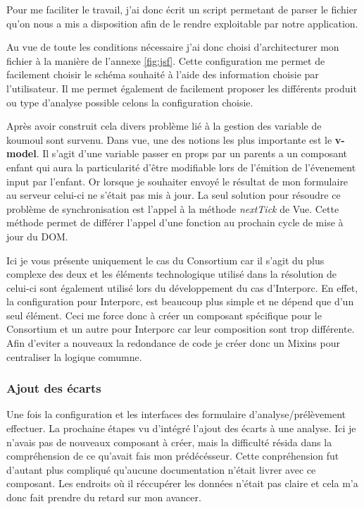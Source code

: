 Pour me faciliter le travail, j'ai donc écrit un script permetant de parser le fichier qu'on nous a mis a disposition afin de le rendre exploitable par notre application. 

Au vue de toute les conditions nécessaire j'ai donc choisi d'architecturer mon fichier à la manière de l'annexe \ref{fig:jsf}. Cette configuration me permet de facilement choisir le schéma souhaité à l'aide des information choisie par l'utilisateur. Il me permet également de facilement proposer les différents produit ou type d'analyse possible celons la configuration choisie.

Après avoir construit cela divers problème lié à la gestion des variable de koumoul sont survenu. Dans vue, une des notions les plus importante est le \textbf{v-model}\cite{vmodel}. Il s'agit d'une variable passer en props par un parents a un composant enfant qui aura la particularité d'être modifiable lors de l'émition de l'évenement input par l'enfant. Or lorsque je souhaiter envoyé le résultat de mon formulaire au serveur celui-ci ne s'était pas mis à jour. La seul solution pour résoudre ce problème de synchronisation est l'appel à la méthode \textit{nextTick}\cite{nextTick} de Vue. Cette méthode permet de différer l'appel d'une fonction au prochain cycle de mise à jour du DOM.


Ici je vous présente uniquement le cas du Consortium car il s'agit du plus complexe des deux et les éléments technologique utilisé dans la résolution de celui-ci sont également utilisé lors du développement du cas d'Interporc. En effet, la configuration pour Interporc, est beaucoup plus simple et ne dépend que d'un seul élément. Ceci me force donc à créer un composant spécifique pour le Consortium et un autre pour Interporc car leur composition sont trop différente. Afin d'eviter a nouveaux la redondance de code je créer donc un Mixins pour centraliser la logique comumne. 

\subsubsection{Ajout des écarts}
Une fois la configuration et les interfaces des formulaire d'analyse/prélèvement effectuer. La prochaine étapes vu d'intégré l'ajout des écarts à une analyse. Ici je n'avais pas de nouveaux composant à créer, mais la difficulté résida dans la compréhension de ce qu'avait fais mon prédécésseur. Cette conpréhension fut d'autant plus compliqué qu'aucune documentation n'était livrer avec ce composant. Les endroits où il réccupérer les données n'était pas claire et cela m'a donc fait prendre du retard sur mon avancer. 

